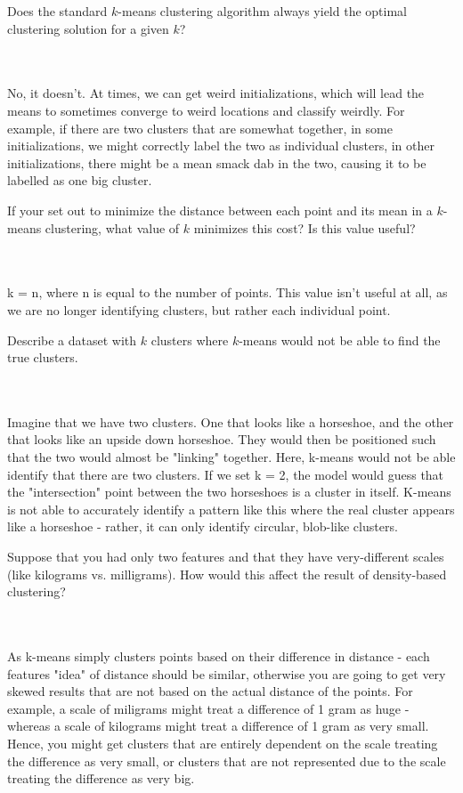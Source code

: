 \documentclass{article}
\def\blu#1{{\color{blu}#1}}
\def\enum#1{\begin{enumerate}#1\end{enumerate}}
\begin{document}
\enum{
\blu{\item Does the standard $k$-means clustering algorithm always yield the optimal clustering solution for a given $k$?}\\\\ No, it doesn't. At times, we can get weird initializations, which will lead the means to sometimes converge to weird locations and classify weirdly. For example, if there are two clusters that are somewhat together, in some initializations, we might correctly label the two as individual clusters, in other initializations, there might be a mean smack dab in the two, causing it to be labelled as one big cluster.
\blu{\item If your set out to minimize the distance between each point and its mean in a $k$-means clustering, what value of $k$ minimizes this cost? Is this value useful?} \\\\ k = n, where n is equal to the number of points. This value isn't useful at all, as we are no longer identifying clusters, but rather each individual point.
\blu{\item Describe a dataset with $k$ clusters where $k$-means would not be able to find the true clusters.} \\\\ Imagine that we have two clusters. One that looks like a horseshoe, and the other that looks like an upside down horseshoe. They would then be positioned such that the two would almost be "linking" together. Here, k-means would not be able identify that there are two clusters. If we set k = 2, the model would guess that the "intersection" point between the two horseshoes is a cluster in itself. K-means is not able to accurately identify a pattern like this where the real cluster appears like a horseshoe - rather, it can only identify circular, blob-like clusters.
\blu{\item Suppose that you had only two features and that they have very-different scales (like kilograms vs. milligrams). How would this affect the result of density-based clustering?} \\\\ As k-means simply clusters points based on their difference in distance - each features "idea" of distance should be similar, otherwise you are going to get very skewed results that are not based on the actual distance of the points. For example, a scale of miligrams might treat a difference of 1 gram as huge - whereas a scale of kilograms might treat a difference of 1 gram as very small. Hence, you might get clusters that are entirely dependent on the scale treating the difference as very small, or clusters that are not represented due to the scale treating the difference as very big.
}
\end{document}
